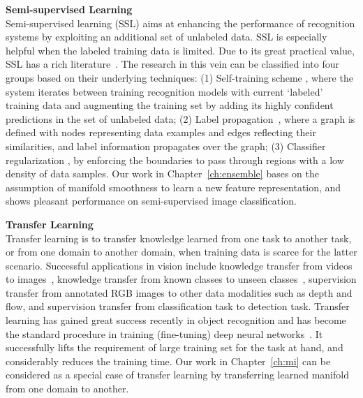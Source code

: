  \textbf{ {Semi-supervised Learning} } \\
Semi-supervised learning (SSL) aims at enhancing the
performance of recognition systems  by exploiting an additional set of
unlabeled data. SSL is especially helpful when the labeled training data is limited. 
Due to its great practical value, SSL has a rich
literature~\citep{book06:ssl, Zhu:ISL:2009}.  The research in this vein can be classified into 
four groups based on their underlying techniques:  
(1) Self-training scheme \citep{co-training:98, Guillaumin:cvpr:10, Semi:eccv12}, where the system iterates between training
recognition models with current `labeled' training data and augmenting
the training set by adding its highly confident predictions in the set
of unlabeled data; (2)  Label propagation~\citep{Zhu:Harmonic:03, Zhou:nips:04, Belkin:semiframe:2006, Fergus09, Ebert2013}, where a graph is defined with nodes representing data examples and edges reflecting their
similarities, and label information propagates over the graph; (3) Classifier regularization \citep{Joachims:1999, SemiSVM, SemiForest, deep:ssl}, by enforcing the boundaries to pass through regions with a low density of data samples.
Our work in Chapter~\ref{ch:ensemble} bases on the assumption of manifold smoothness to learn a new feature representation, and shows pleasant performance on semi-supervised image classification.  

\textbf{  {Transfer Learning}}  \\
Transfer learning is to transfer knowledge learned from one task to another task, or from one domain to another domain, when training data is scarce for the latter scenario. 
 Successful applications in vision include knowledge transfer from videos to images~\citep{tl:kernel:11, DA:iccv11,
  DASA:iccv13}, knowledge transfer from known classes to unseen
classes~\citep{tl:attribute:09},  supervision transfer \citep{SuTransfer}  from annotated RGB images to other data modalities such
 as depth and flow, and supervision transfer \citep{lsda}  from classification task to detection task. 
Transfer learning has gained great success recently in object recognition and has become the standard procedure in training (fine-tuning) deep neural networks~\citep{rcnn, Long_2015_CVPR}. It successfully lifts the requirement of large training set for the task at hand, and considerably reduces the training time.  
Our work in Chapter~\ref{ch:mi} can be considered as a special case of transfer learning by transferring learned manifold from one domain to another. 
  
